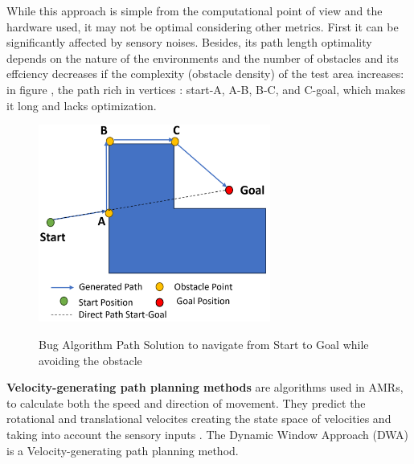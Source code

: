 While this approach is simple from the computational point of view and the hardware used, it may not be 
optimal considering other metrics. First it can be significantly affected by sensory noises.
Besides, its path length optimality depends on the nature of the environments and the number of obstacles 
and its effciency decreases if the complexity (obstacle density) of the test area increases: in figure 
, the path rich in vertices : start-A, A-B, B-C, and C-goal, which makes it 
long and lacks optimization.

\begin{figure}[H]
    \begin{center}
        \includegraphics[width=3in]{images/Chap1/Bug_Algo.png}\\
        \caption{Bug Algorithm Path Solution to navigate from Start to Goal while avoiding
        the obstacle}
        \label{Bug_Algo}
        \end{center}
\end{figure}

\textbf{Velocity-generating path planning methods} are algorithms used in AMRs, to calculate both 
the speed and direction of movement. They predict the rotational and translational velocites 
creating the state space of velocities and taking into account the sensory inputs \cite{R28}. 
The Dynamic Window Approach (DWA) is a Velocity-generating path planning method.

